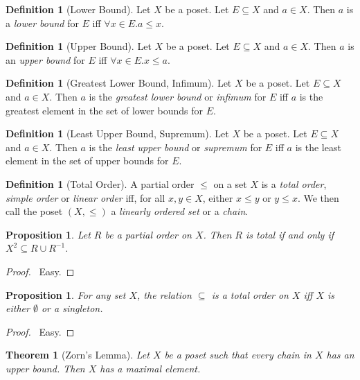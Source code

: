\documentclass{report}
\let\qed\relax
\newtheorem{prop}[ax]{Proposition}
\newtheorem{thm}[ax]{Theorem}
\theoremstyle{definition}
\newtheorem{df}[ax]{Definition}
\begin{document}
\begin{df}[Lower Bound]
Let $X$ be a poset. Let $E \subseteq X$ and $a \in X$. Then $a$ is a \emph{lower bound} for $E$ iff $\forall x \in E. a \leq x$.
\end{df}

\begin{df}[Upper Bound]
Let $X$ be a poset. Let $E \subseteq X$ and $a \in X$. Then $a$ is an \emph{upper bound} for $E$ iff $\forall x \in E. x \leq a$.
\end{df}

\begin{df}[Greatest Lower Bound, Infimum]
Let $X$ be a poset. Let $E \subseteq X$ and $a \in X$. Then $a$ is the \emph{greatest lower bound} or \emph{infimum} for $E$ iff $a$ is the greatest element in the set of lower bounds for $E$.
\end{df}

\begin{df}[Least Upper Bound, Supremum]
Let $X$ be a poset. Let $E \subseteq X$ and $a \in X$. Then $a$ is the \emph{least upper bound} or \emph{supremum} for $E$ iff $a$ is the least element in the set of upper bounds for $E$.
\end{df}

\begin{df}[Total Order]
A partial order $\leq$ on a set $X$ is a \emph{total order}, \emph{simple order} or \emph{linear order} iff, for all $x,y \in X$, either $x \leq y$ or $y \leq x$.
We then call the poset $(X, \leq)$ a \emph{linearly ordered set} or a \emph{chain}.
\end{df}

\begin{prop}
Let $R$ be a partial order on $X$. Then $R$ is total if and only if $X^2 \subseteq R \cup R^{-1}$.
\end{prop}

\begin{proof}
\pf\ Easy. \qed
\end{proof}

\begin{prop}
For any set $X$, the relation $\subseteq$ is a total order on $X$ iff $X$ is either $\emptyset$ or a singleton.
\end{prop}

\begin{proof}
\pf\ Easy. \qed
\end{proof}

\begin{thm}[Zorn's Lemma]
Let $X$ be a poset such that every chain in $X$ has an upper bound. Then $X$ has a maximal element.
\end{thm}
\end{document}
